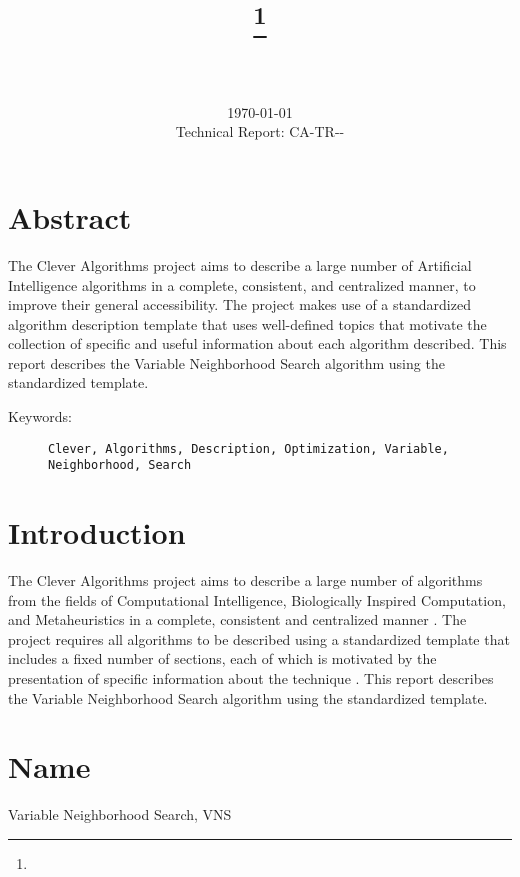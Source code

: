 \documentclass[a4paper, 11pt]{article}
\title{{\myreporttitle}\footnote{\myreportlicense}}
\author{\myreportauthor\\{\myreportemail}\\\small\myreportproject}
\date{\today\\{\small{Technical Report: CA-TR-{\myreportdate}-\myreportversion}}}
\begin{document}
\maketitle

\section*{Abstract} 
The Clever Algorithms project aims to describe a large number of Artificial Intelligence algorithms in a complete, consistent, and centralized manner, to improve their general accessibility. 
The project makes use of a standardized algorithm description template that uses well-defined topics that motivate the collection of specific and useful information about each algorithm described.
This report describes the Variable Neighborhood Search algorithm using the standardized template.

\begin{description}
	\item[Keywords:] {\small\texttt{Clever, Algorithms, Description, Optimization, Variable, Neighborhood, Search}}
\end{description} 

\section{Introduction} 
\label{sec:intro}
The Clever Algorithms project aims to describe a large number of algorithms from the fields of Computational Intelligence, Biologically Inspired Computation, and Metaheuristics in a complete, consistent and centralized manner \cite{Brownlee2010}.
The project requires all algorithms to be described using a standardized template that includes a fixed number of sections, each of which is motivated by the presentation of specific information about the technique \cite{Brownlee2010a}.
This report describes the Variable Neighborhood Search algorithm using the standardized template.

\section{Name} 
\label{sec:name}
Variable Neighborhood Search, VNS
\end{document}
